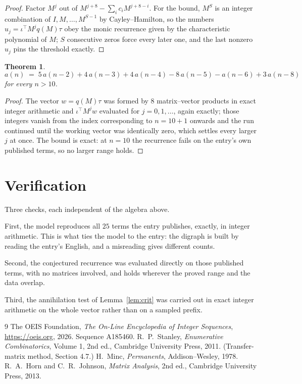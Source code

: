\documentclass[11pt,a4paper]{article}
\theoremstyle{plain}
\newtheorem{theorem}{Theorem}
\theoremstyle{definition}
\begin{document}
\begin{proof}
Factor $M^{j}$ out of $M^{j+8}-\sum_ic_iM^{j+8-i}$. For the bound, $M^{S}$
is an integer combination of $I,M,\dots,M^{S-1}$ by Cayley--Hamilton, so the numbers
$u_j=\iota^{\!\top}M^{j}q(M)\tau$ obey the monic recurrence given by the characteristic
polynomial of $M$; $S$ consecutive zeros force every later one, and the last nonzero $u_j$
pins the threshold exactly.
\end{proof}

\begin{theorem}
\[
a(n)\;=\;5\,a(n-2) + 4\,a(n-3) + 4\,a(n-4) - 8\,a(n-5) - a(n-6) + 3\,a(n-8)
\]
for every $n>10$.
\end{theorem}

\begin{proof}
The vector $w=q(M)\tau$ was formed by $8$ matrix--vector products in exact integer
arithmetic and $\iota^{\!\top}M^{j}w$ evaluated for $j=0,1,\dots$, again exactly; those
integers vanish from the index corresponding to $n=10+1$ onwards and the run continued
until the working vector was identically zero, which settles every larger $j$ at once. The bound is exact: at $n=10$ the recurrence fails on the entry's own published terms, so no larger range holds.
\end{proof}

\section{Verification}

Three checks, each independent of the algebra above.

First, the model reproduces all $25$ terms the entry publishes, exactly, in integer
arithmetic. This is what ties the model to the entry: the digraph is built by reading the
entry's English, and a misreading gives different counts.

Second, the conjectured recurrence was evaluated directly on those published terms, with no
matrices involved, and holds wherever the proved range and the data overlap.

Third, the annihilation test of Lemma~\ref{lem:crit} was carried out in exact integer
arithmetic on the whole vector rather than on a sampled prefix.

\begin{thebibliography}{9}
 The OEIS Foundation, \emph{The On-Line Encyclopedia of Integer
Sequences}, \url{https://oeis.org}, 2026. Sequence A185460.
 R.~P.~Stanley, \emph{Enumerative Combinatorics}, Volume 1, 2nd ed.,
Cambridge University Press, 2011. (Transfer-matrix method, Section 4.7.)
 H.~Minc, \emph{Permanents}, Addison--Wesley, 1978.
 R.~A.~Horn and C.~R.~Johnson, \emph{Matrix Analysis}, 2nd ed., Cambridge
University Press, 2013.
\end{thebibliography}
\end{document}
